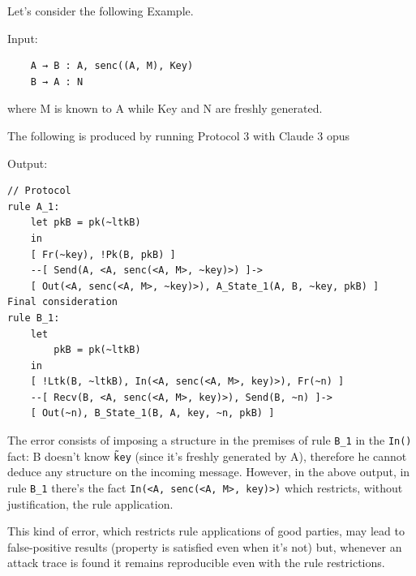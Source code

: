 \begin{Example}
\label{Ex:semantic_error_imposingstructure}
Let's consider the following Example.

\noindent Input:
\begin{verbatim}
    A → B : A, senc((A, M), Key)
    B → A : N
\end{verbatim}
where M is known to A while Key and N are freshly generated.

The following is produced by running Protocol 3 with Claude 3 opus

\noindent Output:
\begin{verbatim}
// Protocol 
rule A_1:
    let pkB = pk(~ltkB) 
    in
    [ Fr(~key), !Pk(B, pkB) ]
    --[ Send(A, <A, senc(<A, M>, ~key)>) ]->
    [ Out(<A, senc(<A, M>, ~key)>), A_State_1(A, B, ~key, pkB) ]
Final consideration
rule B_1:
    let 
        pkB = pk(~ltkB)
    in
    [ !Ltk(B, ~ltkB), In(<A, senc(<A, M>, key)>), Fr(~n) ]
    --[ Recv(B, <A, senc(<A, M>, key)>), Send(B, ~n) ]->  
    [ Out(~n), B_State_1(B, A, key, ~n, pkB) ]
\end{verbatim}
The error consists of imposing a structure in the premises of rule \texttt{B\_1} in the \texttt{In()} fact: B doesn't know \texttt{\~key} (since it's freshly generated by A), therefore he cannot deduce any structure on the incoming message. However, in the above output, in rule \texttt{B\_1} there's the fact \texttt{In(<A, senc(<A, M>, key)>)} which restricts, without justification, the rule application.

This kind of error, which restricts rule applications of good parties, may lead to false-positive results (property is satisfied even when it's not) but, whenever an attack trace is found it remains reproducible even with the rule restrictions.
\end{Example}




